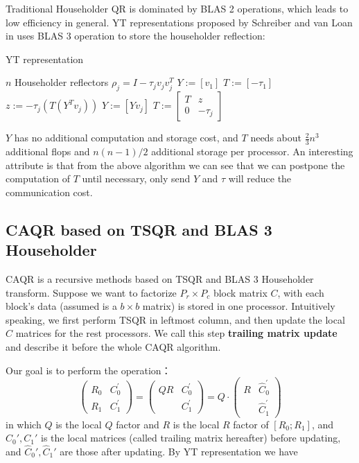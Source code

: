 \documentclass{article}
\begin{document}
Traditional Householder QR is dominated by BLAS 2 operations, which leads to low efficiency in  general. YT representations proposed by Schreiber and van Loan in \cite{wy1989} uses BLAS 3 operation to store the householder reflection:

\begin{algorithm}[htbp]
	\caption{YT representation}
	\label{alg:yt}
	\begin{algorithmic}[1]
		\REQUIRE $n$ Householder reflectors $\rho_j = I - \tau_j v_j v_j^T$
		\STATE $Y:=[v_1]$
		\STATE $T:=[-\tau_1]$
		\ELSE
		\STATE $z := -\tau_j(T(Y^Tv_j))$
		\STATE $Y := [Y v_j]$
		\STATE $T := \begin{bmatrix}
		T & z\\0 & -\tau_j
		\end{bmatrix}$
		\ENDIF
		\ENDFOR
	\end{algorithmic}
\end{algorithm}

$Y$ has no additional computation and storage cost, and $T$ needs about $\frac{2}{3}n^3$ additional flops and $n(n-1)/2$ additional storage per processor. An interesting attribute is that from the above algorithm we can see that we can postpone the computation of $T$ until necessary, only send $Y$ and $\tau$ will reduce the communication cost.
\subsection{CAQR based on TSQR and BLAS 3 Householder}

CAQR is a recursive methods based on TSQR and BLAS 3 Householder transform. Suppose we want to factorize $P_r \times P_c$ block matrix $C$, with each block's data (assumed is a $b\times b$ matrix) is stored in one processor. Intuitively speaking, we first perform TSQR in leftmost column, and then update the local $C$ matrices for the rest processors. We call this step \textbf{trailing matrix update} and describe it before the whole CAQR algorithm.

Our goal is to perform the operation：
\begin{equation}\left(\begin{array}{cc}
R_{0} & C_{0}^{\prime} \\
R_{1} & C_{1}^{\prime}
\end{array}\right)=\left(\begin{array}{cc}
Q R & C_{0}^{\prime} \\
& C_{1}^{\prime}
\end{array}\right)=Q \cdot\left(\begin{array}{cc}
R & \hat{C}_{0}^{\prime} \\
& \hat{C}_{1}^{\prime}
\end{array}\right)\end{equation}
in which $Q$ is the local $Q$ factor and $R$ is the local $R$ factor of $[R_0;R_1]$, and $C_0', C_1'$ is the local matrices (called trailing matrix hereafter) before updating, and $\hat C_0', \hat C_1'$ are those after updating. By YT representation we have 
\end{document}
